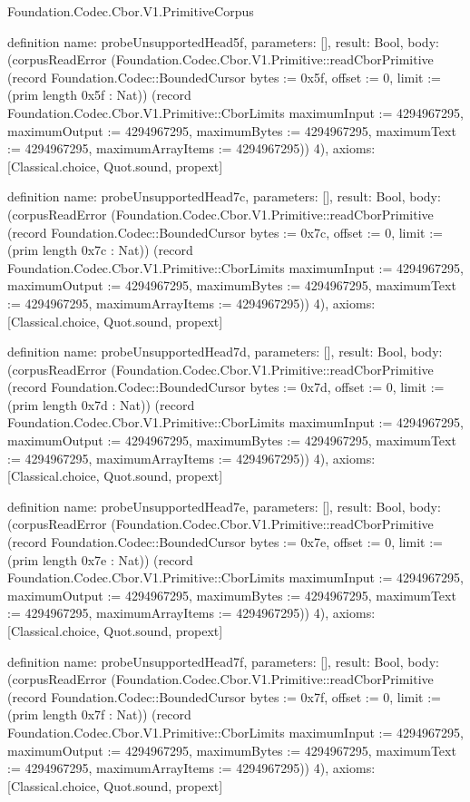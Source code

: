 \begin{lexlean}{Foundation.Codec.Cbor.V1.PrimitiveCorpus}
\begin{semanticmodule}
definition{
  name: probeUnsupportedHead5f,
  parameters: [],
  result: Bool,
  body: (corpusReadError (Foundation.Codec.Cbor.V1.Primitive::readCborPrimitive (record Foundation.Codec::BoundedCursor {bytes := 0x5f, offset := 0, limit := (prim length 0x5f : Nat)}) (record Foundation.Codec.Cbor.V1.Primitive::CborLimits {maximumInput := 4294967295, maximumOutput := 4294967295, maximumBytes := 4294967295, maximumText := 4294967295, maximumArrayItems := 4294967295})) 4),
  axioms: [Classical.choice, Quot.sound, propext]
}

definition{
  name: probeUnsupportedHead7c,
  parameters: [],
  result: Bool,
  body: (corpusReadError (Foundation.Codec.Cbor.V1.Primitive::readCborPrimitive (record Foundation.Codec::BoundedCursor {bytes := 0x7c, offset := 0, limit := (prim length 0x7c : Nat)}) (record Foundation.Codec.Cbor.V1.Primitive::CborLimits {maximumInput := 4294967295, maximumOutput := 4294967295, maximumBytes := 4294967295, maximumText := 4294967295, maximumArrayItems := 4294967295})) 4),
  axioms: [Classical.choice, Quot.sound, propext]
}

definition{
  name: probeUnsupportedHead7d,
  parameters: [],
  result: Bool,
  body: (corpusReadError (Foundation.Codec.Cbor.V1.Primitive::readCborPrimitive (record Foundation.Codec::BoundedCursor {bytes := 0x7d, offset := 0, limit := (prim length 0x7d : Nat)}) (record Foundation.Codec.Cbor.V1.Primitive::CborLimits {maximumInput := 4294967295, maximumOutput := 4294967295, maximumBytes := 4294967295, maximumText := 4294967295, maximumArrayItems := 4294967295})) 4),
  axioms: [Classical.choice, Quot.sound, propext]
}

definition{
  name: probeUnsupportedHead7e,
  parameters: [],
  result: Bool,
  body: (corpusReadError (Foundation.Codec.Cbor.V1.Primitive::readCborPrimitive (record Foundation.Codec::BoundedCursor {bytes := 0x7e, offset := 0, limit := (prim length 0x7e : Nat)}) (record Foundation.Codec.Cbor.V1.Primitive::CborLimits {maximumInput := 4294967295, maximumOutput := 4294967295, maximumBytes := 4294967295, maximumText := 4294967295, maximumArrayItems := 4294967295})) 4),
  axioms: [Classical.choice, Quot.sound, propext]
}

definition{
  name: probeUnsupportedHead7f,
  parameters: [],
  result: Bool,
  body: (corpusReadError (Foundation.Codec.Cbor.V1.Primitive::readCborPrimitive (record Foundation.Codec::BoundedCursor {bytes := 0x7f, offset := 0, limit := (prim length 0x7f : Nat)}) (record Foundation.Codec.Cbor.V1.Primitive::CborLimits {maximumInput := 4294967295, maximumOutput := 4294967295, maximumBytes := 4294967295, maximumText := 4294967295, maximumArrayItems := 4294967295})) 4),
  axioms: [Classical.choice, Quot.sound, propext]
}


\end{semanticmodule}
\end{lexlean}
